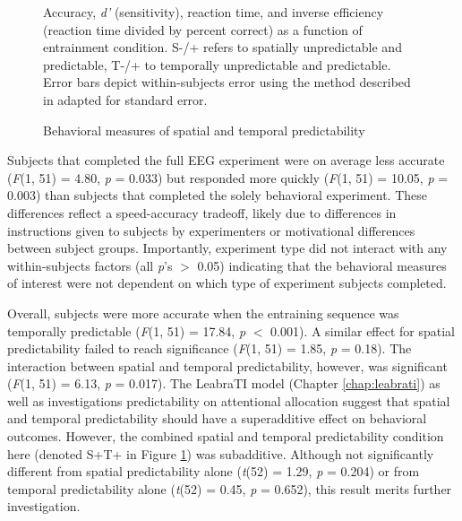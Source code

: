 \documentclass[dwyatte_dissertation.tex]{subfiles}
\begin{document}
\begin{figure}[h!]
\begin{center}
\begin{tabular}{ll}
\end{tabular}
\end{center}
\caption{Behavioral measures of spatial and temporal predictability}{Accuracy, \textit{d'} (sensitivity), reaction time, and inverse efficiency (reaction time divided by percent correct) as a function of entrainment condition. S-/+ refers to spatially unpredictable and predictable, T-/+ to temporally unpredictable and predictable. Error bars depict within-subjects error using the method described in \protect{} adapted for standard error.}
\label{fig:pleast_behave}
\end{figure}

Subjects that completed the full EEG experiment were on average less accurate (\textit{F}(1, 51) = 4.80, \textit{p} = 0.033) but responded more quickly (\textit{F}(1, 51) = 10.05, \textit{p} = 0.003) than subjects that completed the solely behavioral experiment. These differences reflect a speed-accuracy tradeoff, likely due to differences in instructions given to subjects by experimenters or motivational differences between subject groups. Importantly, experiment type did not interact with any within-subjects factors (all \textit{p}'s $>$ 0.05) indicating that the behavioral measures of interest were not dependent on which type of experiment subjects completed.

Overall, subjects were more accurate when the entraining sequence was temporally predictable (\textit{F}(1, 51) = 17.84, \textit{p} $<$ 0.001). A similar effect for spatial predictability failed to reach significance (\textit{F}(1, 51) = 1.85, \textit{p} = 0.18). The interaction between spatial and temporal predictability, however, was significant (\textit{F}(1, 51) = 6.13, \textit{p} = 0.017). The LeabraTI model (Chapter \ref{chap:leabrati}) as well as investigations predictability on attentional allocation \cite[e.g.,]{DohertyRaoMesulamEtAl05,RohenkohlGouldPessoaEtAl14} suggest that spatial and temporal predictability should have a superadditive effect on behavioral outcomes. However, the combined spatial and temporal predictability condition here (denoted S+T+ in Figure \ref{fig:pleast_behave}) was subadditive. Although not significantly different from spatial predictability alone (\textit{t}(52) = 1.29, \textit{p} = 0.204) or from temporal predictability alone (\textit{t}(52) = 0.45, \textit{p} = 0.652), this result merits further investigation. 
\end{document}
